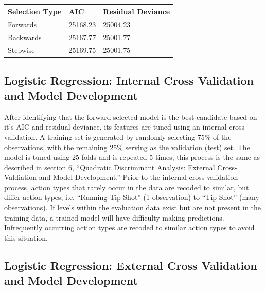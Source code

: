 \documentclass[american,]{article}
\begin{document}
\begin{table}[H]
\centering
\begin{tabular}{lll}
\toprule
Selection Type & AIC & Residual Deviance\\
\midrule
\rowcolor{gray!6}  Forwards & 25168.23 & 25004.23\\
Backwards & 25167.77 & 25001.77\\
\rowcolor{gray!6}  Stepwise & 25169.75 & 25001.75\\
\bottomrule
\end{tabular}
\end{table}

\hypertarget{logistic-regression-internal-cross-validation-and-model-development}{%
\subsection{\texorpdfstring{\textbf{Logistic Regression: Internal Cross Validation and Model Development}}{Logistic Regression: Internal Cross Validation and Model Development}}\label{logistic-regression-internal-cross-validation-and-model-development}}

After identifying that the forward selected model is the best candidate based on it's AIC and residual deviance, its features are tuned using an internal cross validation. A training set is generated by randomly selecting 75\% of the observations, with the remaining 25\% serving as the validation (test) set. The model is tuned using 25 folds and is repeated 5 times, this process is the same as described in section 6, ``Quadratic Discriminant Analysis: External Cross-Valdiation and Model Development.'' Prior to the internal cross validation process, action types that rarely occur in the data are recoded to similar, but differ action types, i.e. ``Running Tip Shot'' (1 observation) to ``Tip Shot'' (many observations). If levels within the evaluation data exist but are not present in the training data, a trained model will have difficulty making predictions. Infrequently occurring action types are recoded to similar action types to avoid this situation.

\hypertarget{logistic-regression-external-cross-validation-and-model-development}{%
\subsection{\texorpdfstring{\textbf{Logistic Regression: External Cross Validation and Model Development}}{Logistic Regression: External Cross Validation and Model Development}}\label{logistic-regression-external-cross-validation-and-model-development}}
\end{document}
